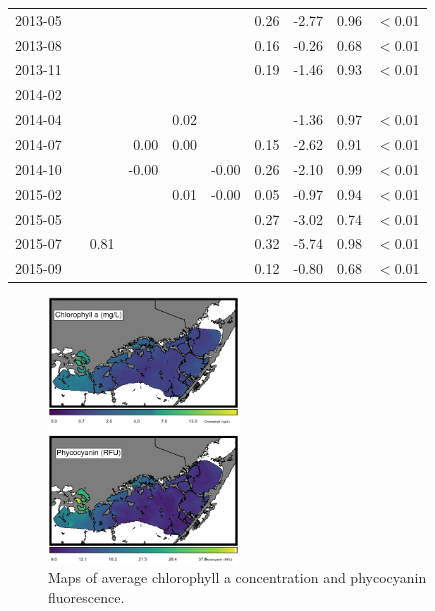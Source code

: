 \begin{table}
\begin{tabular}{rrrrrrrrrr}
  2013-05 &  &  &  &  &  & 0.26 & -2.77 & 0.96 & $<$0.01 \\ 
  2013-08 &  &  &  &  &  & 0.16 & -0.26 & 0.68 & $<$0.01 \\ 
  2013-11 &  &  &  &  &  & 0.19 & -1.46 & 0.93 & $<$0.01 \\ 
  2014-02 &  &  &  &  &  &  &  &  &  \\ 
  2014-04 &  &  &  & 0.02 &  &  & -1.36 & 0.97 & $<$0.01 \\ 
  2014-07 &  &  & 0.00 & 0.00 &  & 0.15 & -2.62 & 0.91 & $<$0.01 \\ 
  2014-10 &  &  & -0.00 &  & -0.00 & 0.26 & -2.10 & 0.99 & $<$0.01 \\ 
  2015-02 &  &  &  & 0.01 & -0.00 & 0.05 & -0.97 & 0.94 & $<$0.01 \\ 
  2015-05 &  &  &  &  &  & 0.27 & -3.02 & 0.74 & $<$0.01 \\ 
  2015-07 &  & 0.81 &  &  &  & 0.32 & -5.74 & 0.98 & $<$0.01 \\ 
  2015-09 &  &  &  &  &  & 0.12 & -0.80 & 0.68 & $<$0.01 \\  
   \hline
\end{tabular}
\end{table}



\begin{figure}
  \centering
  \includegraphics[width=0.45\textwidth]{../../figures/avmap.png}
  \caption{Maps of average chlorophyll a concentration and phycocyanin fluorescence.}
  \label{fig:6}
\end{figure}



